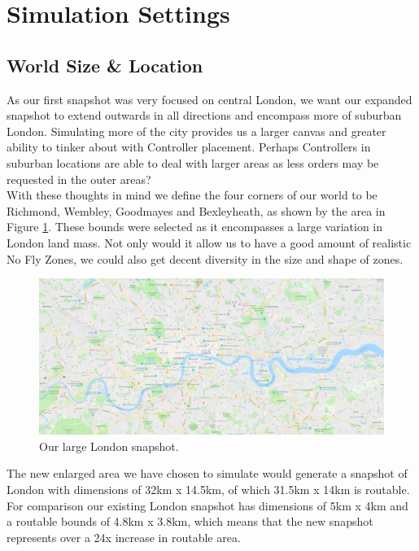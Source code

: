 \documentclass[a4paper,11pt,titlepage]{report}
\begin{document}
\clearpage
\section{Simulation Settings}
\subsection{World Size \& Location}
As our first snapshot was very focused on central London, we want our expanded snapshot to extend outwards in all directions and encompass more of suburban London. Simulating more of the city provides us a larger canvas and greater ability to tinker about with Controller placement. Perhaps Controllers in suburban locations are able to deal with larger areas as less orders may be requested in the outer areas?\\

With these thoughts in mind we define the four corners of our world to be Richmond, Wembley, Goodmayes and Bexleyheath, as shown by the area in Figure \ref{fig:london_snapshot_large}. These bounds were selected as it encompasses a large variation in London land mass. Not only would it allow us to have a good amount of realistic No Fly Zones, we could also get decent diversity in the size and shape of zones.

\begin{figure}[!hbpt]
  \center
  \includegraphics[width=\linewidth]{img/london_snapshot_large.png}
  \caption{Our large London snapshot.}
  \label{fig:london_snapshot_large}
\end{figure}

The new enlarged area we have chosen to simulate would generate a snapshot of London with dimensions of 32km x 14.5km, of which 31.5km x 14km is routable. For comparison our existing London snapshot has dimensions of 5km x 4km and a routable bounds of 4.8km x 3.8km, which means that the new snapshot represents over a 24x increase in routable area.
\end{document}
